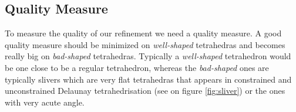 \documentclass[11pt]{article}
\begin{document}
%
%
%
%
% 
%
%
%
%
%
%
%
%
%
%

\subsection{Quality Measure}

To measure the quality of our refinement we need a quality measure. A good quality measure should be minimized
on \emph{well-shaped} tetrahedras and becomes really big on \emph{bad-shaped} tetrahedras. Typically a
\emph{well-shaped} tetrahedron would be one close to be a regular tetrahedron, whereas the \emph{bad-shaped}
ones are typically slivers which are very flat tetrahedras that appears in constrained and unconstrained
Delaunay tetrahedrisation (see on figure \ref{fig:sliver}) or the ones with very acute angle.
\end{document}

